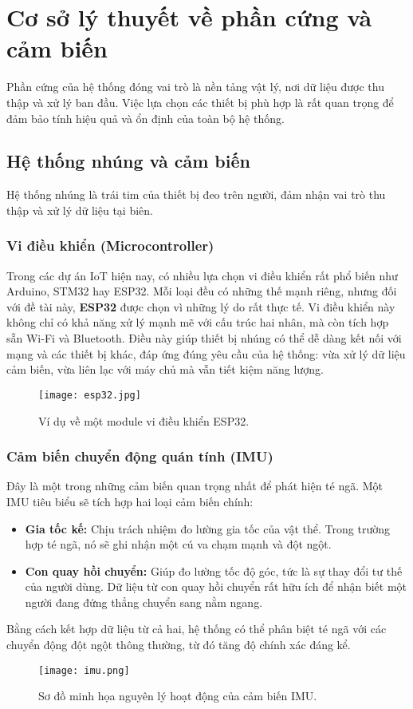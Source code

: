 \section{Cơ sở lý thuyết về phần cứng và cảm biến}

Phần cứng của hệ thống đóng vai trò là nền tảng vật lý, nơi dữ liệu được thu thập và xử lý ban đầu. Việc lựa chọn các thiết bị phù hợp là rất quan trọng để đảm bảo tính hiệu quả và ổn định của toàn bộ hệ thống.

\subsection{Hệ thống nhúng và cảm biến}

Hệ thống nhúng là trái tim của thiết bị đeo trên người, đảm nhận vai trò thu thập và xử lý dữ liệu tại biên.

\subsubsection{Vi điều khiển (Microcontroller)}
Trong các dự án IoT hiện nay, có nhiều lựa chọn vi điều khiển rất phổ biến như Arduino, STM32 hay ESP32. Mỗi loại đều có những thế mạnh riêng, nhưng đối với đề tài này, \textbf{ESP32} được chọn vì những lý do rất thực tế. Vi điều khiển này không chỉ có khả năng xử lý mạnh mẽ với cấu trúc hai nhân, mà còn tích hợp sẵn Wi-Fi và Bluetooth. Điều này giúp thiết bị nhúng có thể dễ dàng kết nối với mạng và các thiết bị khác, đáp ứng đúng yêu cầu của hệ thống: vừa xử lý dữ liệu cảm biến, vừa liên lạc với máy chủ mà vẫn tiết kiệm năng lượng.
\begin{figure}[h]
    \centering
    \texttt{[image: esp32.jpg]}
    \caption{Ví dụ về một module vi điều khiển ESP32.}
    \label{fig:esp32}
\end{figure}

\subsubsection{Cảm biến chuyển động quán tính (IMU)}
Đây là một trong những cảm biến quan trọng nhất để phát hiện té ngã. Một IMU tiêu biểu sẽ tích hợp hai loại cảm biến chính:
\begin{itemize}
    \item \textbf{Gia tốc kế:} Chịu trách nhiệm đo lường gia tốc của vật thể. Trong trường hợp té ngã, nó sẽ ghi nhận một cú va chạm mạnh và đột ngột.
    \item \textbf{Con quay hồi chuyển:} Giúp đo lường tốc độ góc, tức là sự thay đổi tư thế của người dùng. Dữ liệu từ con quay hồi chuyển rất hữu ích để nhận biết một người đang đứng thẳng chuyển sang nằm ngang.
\end{itemize}
Bằng cách kết hợp dữ liệu từ cả hai, hệ thống có thể phân biệt té ngã với các chuyển động đột ngột thông thường, từ đó tăng độ chính xác đáng kể.
\begin{figure}[h]
    \centering
    \texttt{[image: imu.png]}
    \caption{Sơ đồ minh họa nguyên lý hoạt động của cảm biến IMU.}
    \label{fig:imu_working_principle}
\end{figure}

